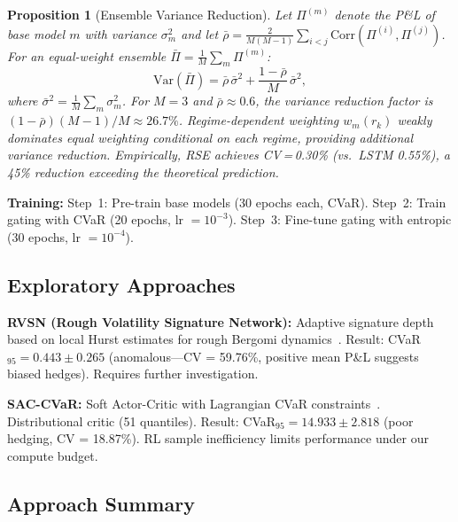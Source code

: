 \documentclass[11pt]{article}
\newtheorem{proposition}[theorem]{Proposition}
\begin{document}
\begin{proposition}[Ensemble Variance Reduction]
\label{prop:ensemble_var}
Let $\Pi^{(m)}$ denote the P\&L of base model $m$ with variance $\sigma_m^2$ and let $\bar\rho = \frac{2}{M(M-1)}\sum_{i<j}\mathrm{Corr}(\Pi^{(i)},\Pi^{(j)})$. For an equal-weight ensemble $\bar\Pi = \frac{1}{M}\sum_m \Pi^{(m)}$:
\begin{equation}
    \mathrm{Var}(\bar\Pi) = \bar\rho\,\bar\sigma^2 + \frac{1-\bar\rho}{M}\,\bar\sigma^2,
\end{equation}
where $\bar\sigma^2 = \frac{1}{M}\sum_m \sigma_m^2$.  For $M=3$ and $\bar\rho \approx 0.6$, the variance reduction factor is $(1-\bar\rho)(M-1)/M \approx 26.7\%$.  Regime-dependent weighting $w_m(r_k)$ weakly dominates equal weighting conditional on each regime, providing additional variance reduction.  Empirically, RSE achieves CV\,=\,0.30\% (vs.\ LSTM 0.55\%), a 45\% reduction exceeding the theoretical prediction.
\end{proposition}

\textbf{Training:} Step~1: Pre-train base models (30 epochs each, CVaR). Step~2: Train gating with CVaR (20 epochs, lr $= 10^{-3}$). Step~3: Fine-tune gating with entropic (30 epochs, lr $= 10^{-4}$).

\subsection{Exploratory Approaches}

\textbf{RVSN (Rough Volatility Signature Network):} Adaptive signature depth based on local Hurst estimates for rough Bergomi dynamics~\citep{gatheral2018volatility}. Result: CVaR$_{95} = 0.443 \pm 0.265$ (anomalous---CV = 59.76\%, positive mean P\&L suggests biased hedges). Requires further investigation.

\textbf{SAC-CVaR:} Soft Actor-Critic with Lagrangian CVaR constraints~\citep{haarnoja2018soft, huang2025sac}. Distributional critic (51 quantiles). Result: CVaR$_{95} = 14.933 \pm 2.818$ (poor hedging, CV = 18.87\%). RL sample inefficiency limits performance under our compute budget.

\subsection{Approach Summary}
\end{document}

